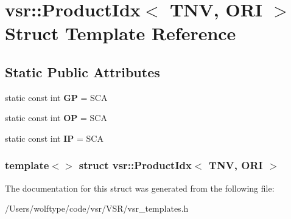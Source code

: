 \hypertarget{structvsr_1_1_product_idx_3_01_t_n_v_00_01_o_r_i_01_4}{\section{vsr\-:\-:Product\-Idx$<$ T\-N\-V, O\-R\-I $>$ Struct Template Reference}
\label{structvsr_1_1_product_idx_3_01_t_n_v_00_01_o_r_i_01_4}
}
\subsection*{Static Public Attributes}
\begin{DoxyCompactItemize}
\item 
\hypertarget{structvsr_1_1_product_idx_3_01_t_n_v_00_01_o_r_i_01_4_a3d87c129b873697785abb0bde02cf91f}{static const int {\bfseries G\-P} = S\-C\-A}\label{structvsr_1_1_product_idx_3_01_t_n_v_00_01_o_r_i_01_4_a3d87c129b873697785abb0bde02cf91f}

\item 
\hypertarget{structvsr_1_1_product_idx_3_01_t_n_v_00_01_o_r_i_01_4_ae58750f9b724ceff122a37c4e1f3ce9e}{static const int {\bfseries O\-P} = S\-C\-A}\label{structvsr_1_1_product_idx_3_01_t_n_v_00_01_o_r_i_01_4_ae58750f9b724ceff122a37c4e1f3ce9e}

\item 
\hypertarget{structvsr_1_1_product_idx_3_01_t_n_v_00_01_o_r_i_01_4_afcbd95068513bf219f366fa7f79e8e51}{static const int {\bfseries I\-P} = S\-C\-A}\label{structvsr_1_1_product_idx_3_01_t_n_v_00_01_o_r_i_01_4_afcbd95068513bf219f366fa7f79e8e51}

\end{DoxyCompactItemize}
\subsubsection*{template$<$$>$ struct vsr\-::\-Product\-Idx$<$ T\-N\-V, O\-R\-I $>$}



The documentation for this struct was generated from the following file\-:\begin{DoxyCompactItemize}
\item 
/\-Users/wolftype/code/vsr/\-V\-S\-R/vsr\-\_\-templates.\-h\end{DoxyCompactItemize}
